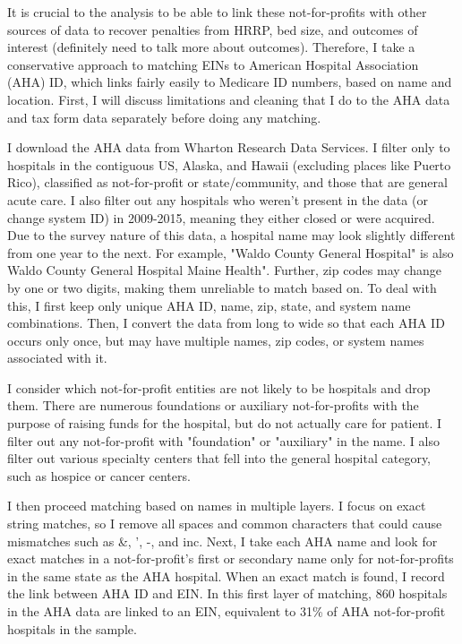 \documentclass[12pt]{article}
\begin{document}
It is crucial to the analysis to be able to link these not-for-profits with other sources of data to recover penalties from HRRP, bed size, and outcomes of interest (definitely need to talk more about outcomes). Therefore, I take a conservative approach to matching EINs to American Hospital Association (AHA) ID, which links fairly easily to Medicare ID numbers, based on name and location. First, I will discuss limitations and cleaning that I do to the AHA data and tax form data separately before doing any matching. 

I download the AHA data from Wharton Research Data Services. I filter only to hospitals in the contiguous US, Alaska, and Hawaii (excluding places like Puerto Rico), classified as not-for-profit or state/community, and those that are general acute care. I also filter out any hospitals who weren't present in the data (or change system ID) in 2009-2015, meaning they either closed or were acquired. Due to the survey nature of this data, a hospital name may look slightly different from one year to the next. For example, "Waldo County General Hospital" is also Waldo County General Hospital Maine Health". Further, zip codes may change by one or two digits, making them unreliable to match based on. To deal with this, I first keep only unique AHA ID, name, zip, state, and system name combinations. Then, I convert the data from long to wide so that each AHA ID occurs only once, but may have multiple names, zip codes, or system names associated with it.

I consider which not-for-profit entities are not likely to be hospitals and drop them. There are numerous foundations or auxiliary not-for-profits with the purpose of raising funds for the hospital, but do not actually care for patient. I filter out any not-for-profit with "foundation" or "auxiliary" in the name. I also filter out various specialty centers that fell into the general hospital category, such as hospice or cancer centers. 

I then proceed matching based on names in multiple layers. I focus on exact string matches, so I remove all spaces and common characters that could cause mismatches such as \&, ', -, and inc. Next, I take each AHA name and look for exact matches in a not-for-profit's first or secondary name only for not-for-profits in the same state as the AHA hospital. When an exact match is found, I record the link between AHA ID and EIN. In this first layer of matching, 860 hospitals in the AHA data are linked to an EIN, equivalent to 31\% of AHA not-for-profit hospitals in the sample. 
\end{document}
